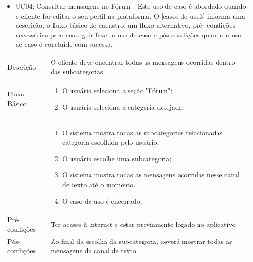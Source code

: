 
\begin{itemize}
	\item UC04: Consultar mensagens no Fórum - Este uso de caso é abordado quando o cliente for editar o seu perfil na plataforma.
	O \autoref{casos-de-uso3} informa uma descrição, o fluxo básico de cadastro, um fluxo alternativo, pré-
	condições necessárias para conseguir fazer o uso de caso e pós-condições quando o uso de
	caso é concluído com sucesso. \\

\end{itemize}


\begin{quadro}[htb]
	\centering
	\ABNTEXfontereduzida
	\label{quadro-exemplo}
	\caption[Caso de Uso Consultar mensagens do Fórum]{Caso de Uso Consultar mensagens do Fórum}
\end{quadro}
\begin{longtable}{|p{3.3cm}|p{12.3cm}|}
	\hline
	\thead{} & \thead{Ator} \\
	\hline
	Descrição & O cliente deve encontrar todas as mensagens ocorridas dentro das subcategorias.\\
	\hline
	Fluxo Básico  & 
	\begin{enumerate}
		\item O usuário seleciona a seção "Fórum";
		\item O usuário seleciona a categoria desejada;
	\end{enumerate}\\
	\hline
	
	\hline
	& 
	\begin{enumerate}
		\item O sistema mostra todas as subcategorias relacionadas categoria escolhida pelo usuário;
		\item O usuário escolhe uma subcategoria;
		\item O sistema mostra todas as mensagens ocorridas nesse canal de texto até o momento. 
		\item O caso de uso é encerrado.
	\end{enumerate}\\
	\hline
	Pré-condições & Ter acesso à internet e estar previamente logado no aplicativo.\\
	\hline
	Pós-condições & Ao final da escolha da subcategoria, deverá mostrar todas as mensagens do canal de texto.\\
	\hline
\end{longtable}

